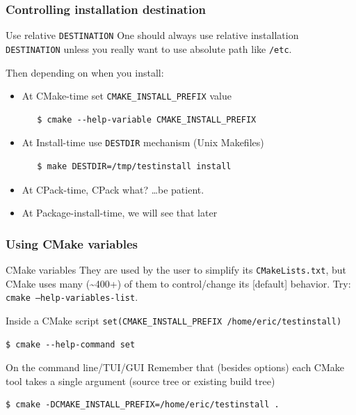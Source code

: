 \documentclass[compress,slidestop,table
              ]
               {beamer}
\newcommand{\fname}[1]{\texttt{#1}}
\begin{document}
\begin{frame}[fragile]
\frametitle{Controlling installation destination}
\begin{alertblock}{Use relative \lstinline!DESTINATION!}
One should always use relative installation \lstinline!DESTINATION!
unless you really want to use absolute path like \fname{/etc}.
\end{alertblock}
Then depending on when you install:
\begin{itemize}
\pause
\item At \textcolor{cmaketimec}{CMake-time} set \lstinline!CMAKE_INSTALL_PREFIX! value

     \begin{Verbatim}
   $ cmake --help-variable CMAKE_INSTALL_PREFIX
     \end{Verbatim}
\pause
\item At \textcolor{installtimec}{Install-time} use \fname{DESTDIR} mechanism (Unix Makefiles)

      \begin{Verbatim}
   $ make DESTDIR=/tmp/testinstall install
      \end{Verbatim}
\pause
\item At \textcolor{cpacktimec}{CPack-time}, CPack what? \ldots be patient.
\item At \textcolor{installtimec}{Package-install-time}, we will see that later
\end{itemize}
\end{frame}


\begin{frame}[fragile]
\frametitle{Using CMake variables}
\begin{block}{CMake variables}
They are used by the user to simplify its \fname{CMakeLists.txt},
but CMake uses many (\textasciitilde 400+) of them to control/change its [default] behavior.
Try: \texttt{cmake --help-variables-list}.
\end{block}
\begin{block}{Inside a CMake script}
\lstinline!set(CMAKE_INSTALL_PREFIX /home/eric/testinstall)!
\begin{Verbatim}
$ cmake --help-command set
\end{Verbatim}
\end{block}
\begin{block}{On the command line/TUI/GUI}
Remember that (besides options) each CMake tool takes a single argument
(source tree or \alert{existing} build tree)
\begin{Verbatim}[fontsize=\scriptsize]
$ cmake -DCMAKE_INSTALL_PREFIX=/home/eric/testinstall .
\end{Verbatim}
\end{block}
\end{frame}
\end{document}
